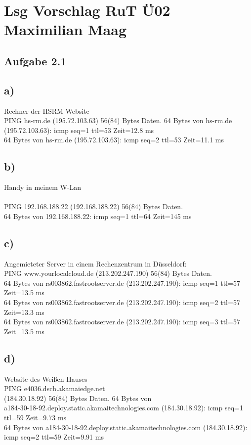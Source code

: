 \documentclass{article}
\begin{document}
	
	\section*{Lsg Vorschlag RuT Ü02 Maximilian Maag}
	\subsection*{Aufgabe 2.1}
	\subsection*{a)}
	Rechner der HSRM Website \\
	PING hs-rm.de (195.72.103.63) 56(84) Bytes Daten.
	64 Bytes von hs-rm.de (195.72.103.63): icmp seq=1 ttl=53 Zeit=12.8 ms \\
	64 Bytes von hs-rm.de (195.72.103.63): icmp seq=2 ttl=53 Zeit=11.1 ms
	
	\subsection*{b)}
	Handy in meinem W-Lan \\ \\
	PING 192.168.188.22 (192.168.188.22) 56(84) Bytes Daten. \\
	64 Bytes von 192.168.188.22: icmp seq=1 ttl=64 Zeit=145 ms
	
	\subsection*{c)}
	Angemieteter Server in einem Rechenzentrum in Düsseldorf: \\
	PING www.yourlocalcloud.de (213.202.247.190) 56(84) Bytes Daten. \\
	64 Bytes von rs003862.fastrootserver.de (213.202.247.190): icmp seq=1 ttl=57 Zeit=13.5 ms \\
	64 Bytes von rs003862.fastrootserver.de (213.202.247.190): icmp seq=2 ttl=57 Zeit=13.3 ms \\
	64 Bytes von rs003862.fastrootserver.de (213.202.247.190): icmp seq=3 ttl=57 Zeit=13.5 ms \\
	\subsection*{d)}
	Website des Weißen Hauses \\
	PING e4036.dscb.akamaiedge.net \\ (184.30.18.92) 56(84) Bytes Daten.
	64 Bytes von \\ a184-30-18-92.deploy.static.akamaitechnologies.com (184.30.18.92): icmp seq=1 ttl=59 Zeit=9.73 ms \\
	64 Bytes von a184-30-18-92.deploy.static.akamaitechnologies.com (184.30.18.92): icmp seq=2 ttl=59 Zeit=9.91 ms
	
\end{document}

